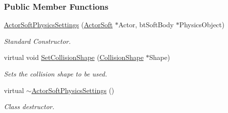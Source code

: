 \subsubsection*{Public Member Functions}
\begin{DoxyCompactItemize}
\item 
\hyperlink{classMezzanine_1_1ActorSoftPhysicsSettings_a1dbdd3a7b8af36cb8353a1af90102073}{ActorSoftPhysicsSettings} (\hyperlink{classMezzanine_1_1ActorSoft}{ActorSoft} $\ast$Actor, btSoftBody $\ast$PhysicsObject)
\begin{DoxyCompactList}\small\item\em Standard Constructor. \item\end{DoxyCompactList}\item 
virtual void \hyperlink{classMezzanine_1_1ActorSoftPhysicsSettings_a4cbaf52fbdedf9c4e0328d3dd608207e}{SetCollisionShape} (\hyperlink{classMezzanine_1_1CollisionShape}{CollisionShape} $\ast$Shape)
\begin{DoxyCompactList}\small\item\em Sets the collision shape to be used. \item\end{DoxyCompactList}\item 
\hypertarget{classMezzanine_1_1ActorSoftPhysicsSettings_a9bd95e4279191ab50e5d60ad4ec07817}{
virtual \hyperlink{classMezzanine_1_1ActorSoftPhysicsSettings_a9bd95e4279191ab50e5d60ad4ec07817}{$\sim$ActorSoftPhysicsSettings} ()}
\label{classMezzanine_1_1ActorSoftPhysicsSettings_a9bd95e4279191ab50e5d60ad4ec07817}

\begin{DoxyCompactList}\small\item\em Class destructor. \item\end{DoxyCompactList}\end{DoxyCompactItemize}
